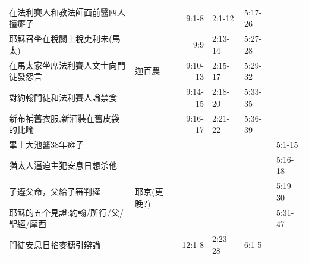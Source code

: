 \begin{table}[H]
\begin{tabular}{p{6.45em}|c|p{4.785em}|r|p{}|p{3.23em}|p{}}
\multicolumn{2}{p{20.em}|}{在法利賽人和教法師面前醫四人擡癱子} & \multicolumn{1}{l|}{\multirow{5}{*}{迦百農}}& \multicolumn{1}{p{4.145em}|}{9:1-8} & \multicolumn{1}{p{4.43em}|}{2:1-12} & \multicolumn{1}{p{3.5em}|}{5:17-26} & \\
\cmidrule{1-2}\cmidrule{4-7}  \multicolumn{2}{p{20.em}|}{耶穌召坐在稅關上稅吏利未(馬太)} & & \multicolumn{1}{p{4.145em}|}{9:9} & \multicolumn{1}{p{4.43em}|}{2:13-14} & \multicolumn{1}{p{3.5em}|}{5:27-28} &\\
\cmidrule{1-2}\cmidrule{4-7}\multicolumn{2}{p{20.em}|}{在馬太家坐席法利賽人文士向門徒發怨言} && \multicolumn{1}{p{4.145em}|}{9:10-13} & \multicolumn{1}{p{4.43em}|}{2:15-17} & \multicolumn{1}{p{3.85em}|}{5:29-32} &  \\
\cmidrule{1-2}\cmidrule{4-7}\multicolumn{2}{p{20.em}|}{對約翰門徒和法利賽人論禁食} && \multicolumn{1}{p{4.145em}|}{9:14-15} & \multicolumn{1}{p{4.43em}|}{2:18-20} & \multicolumn{1}{p{3.85em}|}{5:33-35} &\\ 
\cmidrule{1-2}\cmidrule{4-7}\multicolumn{2}{p{20.em}|}{新布補舊衣服,新酒裝在舊皮袋的比喻} && \multicolumn{1}{p{4.145em}|}{9:16-17} & \multicolumn{1}{p{4.43em}|}{2:21-22} & \multicolumn{1}{p{3.5em}|}{5:36-39} &\\ \midrule


\multicolumn{2}{p{20.em}|}{畢士大池醫38年瘫子} & \multicolumn{1}{l|}{\multirow{5}{*}{耶京(更晚?)}}& &  & &\multicolumn{1}{p{3.95em}}{5:1-15}\\
\cmidrule{1-2}\cmidrule{4-7}\multicolumn{2}{p{20.em}|}{猶太人逼迫主犯安息日想杀他}&       &       &       &       & \multicolumn{1}{p{3.95em}}{5:16-18}\\
\cmidrule{1-2}\cmidrule{4-7}\multicolumn{2}{p{20.em}|}{子遵父命，父給子審判權} &       &       &       &       & \multicolumn{1}{p{3.95em}}{5:19-30} \\
\cmidrule{1-2}\cmidrule{4-7}\multicolumn{2}{p{20.em}|}{耶稣的五个見證:約翰/所行/父/聖經/摩西}&       &       &       &       & \multicolumn{1}{p{3.95em}}{5:31-47}\\ \midrule



\multicolumn{2}{p{12.em}|}{門徒安息日掐麥穗引辯論}&\multicolumn{1}{p{5.3em}|}{從麥地經過} &\multicolumn{1}{p{4.43em}|}{12:1-8}&\multicolumn{1}{p{4.43em}|}{2:23-28}&\multicolumn{1}{p{4.em}|}{6:1-5}& \\  \midrule


\end{tabular}
\end{table}
